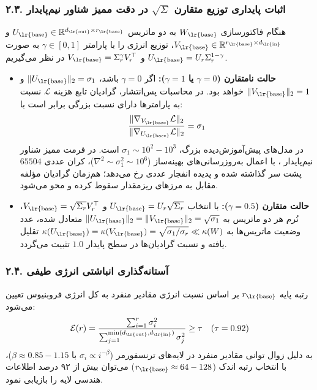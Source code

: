 \subsubsection*{۲.۳. اثبات پایداری توزیع متقارن $\sqrt{\Sigma}$ در دقت ممیز شناور نیم‌پایدار }
هنگام فاکتورسازی $W_{\text{\lr{base}}}$ به دو ماتریس $U_{\text{\lr{base}}} \in \mathbb{R}^{d_{\text{\lr{out}}} \times r_{\text{\lr{base}}}}$ و $V_{\text{\lr{base}}} \in \mathbb{R}^{r_{\text{\lr{base}}} \times d_{\text{\lr{in}}}}$، توزیع انرژی را با پارامتر $\gamma \in [0, 1]$ به صورت $U_{\text{\lr{base}}} = U_r \Sigma_r^{1-\gamma}$ و $V_{\text{\lr{base}}} = \Sigma_r^\gamma V_r^\top$ در نظر می‌گیریم.
\begin{itemize}
    \item \textbf{حالت نامتقارن ($\gamma = 0$ یا $\gamma = 1$):} اگر $\gamma = 0$ باشد، $\|U_{\text{\lr{base}}}\|_2 = \sigma_1$ و $\|V_{\text{\lr{base}}}\|_2 = 1$ خواهد بود. در محاسبات پس‌انتشار، گرادیان تابع هزینه $\mathcal{L}$ نسبت به پارامترها دارای نسبت بزرگی برابر است با:
    \begin{equation}
    \frac{\|\nabla_{V_{\text{\lr{base}}}} \mathcal{L}\|_2}{\|\nabla_{U_{\text{\lr{base}}}} \mathcal{L}\|_2} = \sigma_1
    \end{equation}
    در مدل‌های پیش‌آموزش‌دیده بزرگ، $\sigma_1 \sim 10^2 - 10^3$ است. در فرمت ممیز شناور نیم‌پایدار ، با اعمال به‌روزرسانی‌های بهینه‌ساز  ($\nabla^2 \sim \sigma_1^2 \sim 10^6$)، کران عددی $65504$ پشت سر گذاشته شده و پدیده انفجار عددی  رخ می‌دهد؛ هم‌زمان گرادیان مؤلفه مقابل به مرزهای ریزمقدار  سقوط کرده و محو می‌شود.
    \item \textbf{حالت متقارن ($\gamma = 0.5$):} با انتخاب $U_{\text{\lr{base}}} = U_r \sqrt{\Sigma_r}$ و $V_{\text{\lr{base}}} = \sqrt{\Sigma_r} V_r^\top$، نُرم هر دو ماتریس به $\|U_{\text{\lr{base}}}\|_2 = \|V_{\text{\lr{base}}}\|_2 = \sqrt{\sigma_1}$ متعادل شده، عدد وضعیت ماتریس‌ها به $\kappa(U_{\text{\lr{base}}}) = \kappa(V_{\text{\lr{base}}}) = \sqrt{\sigma_1 / \sigma_r} \ll \kappa(W)$ تقلیل یافته و نسبت گرادیان‌ها در سطح پایدار $1.0$ تثبیت می‌گردد.
\end{itemize}

\subsubsection*{۲.۴. آستانه‌گذاری انباشتی انرژی طیفی }
رتبه پایه $r_{\text{\lr{base}}}$ بر اساس نسبت انرژی مقادیر منفرد به کل انرژی فروبنیوس تعیین می‌شود:
\begin{equation}
\mathcal{E}(r) = \frac{\sum_{i=1}^r \sigma_i^2}{\sum_{j=1}^{\min(d_{\text{\lr{out}}}, d_{\text{\lr{in}}})} \sigma_j^2} \ge \tau \quad (\tau = 0.92)
\end{equation}
به دلیل زوال توانی مقادیر منفرد در لایه‌های ترنسفورمر ($\sigma_i \propto i^{-\beta}$ با $\beta \approx 0.85 - 1.15$)، با انتخاب رتبه اندک ($r_{\text{\lr{base}}} \approx 64 - 128$) می‌توان بیش از ۹۲ درصد اطلاعات هندسی لایه را بازیابی نمود.

